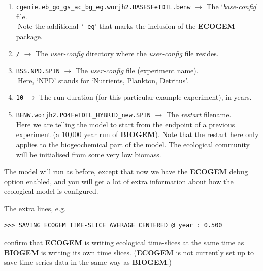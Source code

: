 \documentclass[11pt,fleqn]{book} %
\begin{document}
\vspace{2mm}
\begin{enumerate}[noitemsep]

\item \texttt{cgenie.eb\_go\_gs\_ac\_bg\_eg.worjh2.BASESFeTDTL.benw} $\rightarrow$ The `\textit{base-config}' file. \\
$~$\hfill Note the additional~`\texttt{\_eg}' that marks the inclusion of the \textbf{ECOGEM} package.

\item \texttt{/} $\rightarrow$ The \textit{user-config} directory where the \textit{user-config} file resides.

\item \texttt{BSS.NPD.SPIN} $\rightarrow$ The \textit{user-config} file (experiment name).\\
$~$\hfill Here, `NPD' stands for `Nutrients, Plankton, Detritus'.

\item \texttt{10} $\rightarrow$ The run duration (for this particular example experiment), in years.

\item \texttt{BENW.worjh2.PO4FeTDTL\_HYBRID\_new.SPIN} $\rightarrow$ The \textit{restart} filename.
\\Here we are telling the model to start from the endpoint of a previous experiment (a 10,000 year run of \textbf{BIOGEM}). Note that the restart here only applies to the biogeochemical part of the model. The ecological community will be initialised from some very low biomass.

\end{enumerate}
\vspace{2mm}

The model will run as before, except that now we have the \textbf{ECOGEM} debug option enabled, and you will get a lot of extra information about how the ecological model is configured.
\vspace{1mm}

The extra lines, e.g.
\small\begin{verbatim}
>>> SAVING ECOGEM TIME-SLICE AVERAGE CENTERED @ year : 0.500
\end{verbatim}\normalsize
confirm that \textbf{ECOGEM} is writing ecological time-slices at the same time as \textbf{BIOGEM} is writing its own time slices. (\textbf{ECOGEM} is not currently set up to save time-series data in the same way as \textbf{BIOGEM}.)

\end{document}

